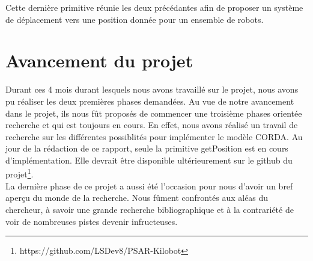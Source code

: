 \documentclass[a4paper,8pt]{report}
\begin{document}
Cette dernière primitive réunie les deux précédantes afin de proposer un système de déplacement vers une position donnée pour un ensemble de robots.\\

\bigskip
\section*{Avancement du projet}\label{sec:name}

Durant ces 4 mois durant lesquels nous avons travaillé sur le projet, nous avons pu réaliser les deux premières phases demandées. Au vue de notre avancement dans le projet, ils nous fût proposés de commencer une troisième phases orientée recherche et qui est toujours en cours. En effet, nous avons réalisé un travail de recherche sur les différentes possiblités pour implémenter le modèle CORDA. Au jour de la rédaction de ce rapport, seule la primitive getPosition est en cours d'implémentation. Elle devrait être disponible ultérieurement sur le github du projet\footnote{https://github.com/LSDev8/PSAR-Kilobot}.\\

\smallskip
La dernière phase de ce projet a aussi été l'occasion pour nous d'avoir un bref aperçu du monde de la recherche.
Nous fûment confrontés aux al\'eas du chercheur, \`a savoir une grande recherche bibliographique et \`a la contrari\'et\'e de voir de nombreuses pistes devenir infructeuses.\\

\end{document}
